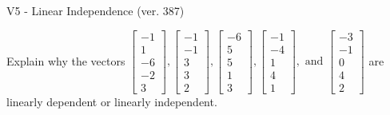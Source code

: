 \begin{exercise}
  \begin{exerciseTitle}V5 - Linear Independence (ver. 387)\end{exerciseTitle}
  \begin{exerciseStatement}
    Explain why the vectors \(\left[\begin{array}{r}
-1 \\
1 \\
-6 \\
-2 \\
3
\end{array}\right] , \left[\begin{array}{r}
-1 \\
-1 \\
3 \\
3 \\
2
\end{array}\right] , \left[\begin{array}{r}
-6 \\
5 \\
5 \\
1 \\
3
\end{array}\right] , \left[\begin{array}{r}
-1 \\
-4 \\
1 \\
4 \\
1
\end{array}\right] , \text{ and } \left[\begin{array}{r}
-3 \\
-1 \\
0 \\
4 \\
2
\end{array}\right]\) are linearly dependent or linearly independent.	



\end{exerciseStatement}
\end{exercise}
